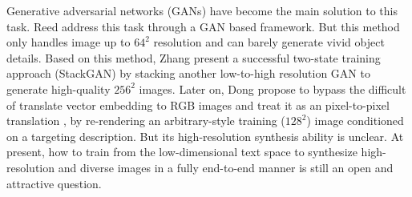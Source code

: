 \documentclass[10pt,twocolumn,letterpaper]{article}
\begin{document}
Generative adversarial networks (GANs) have become the main solution to this task. 
Reed \etal \cite{reed2016generative} address this task through a GAN based framework. But this method only handles image up to $64^2$ resolution and can barely generate vivid object details.
Based on this method, Zhang \etal \cite{han2017stackgan} present a successful two-state training approach (StackGAN) by stacking another low-to-high resolution GAN to generate high-quality $256^2$ images. Later on, Dong \etal \cite{dong2017semantic} propose to bypass the difficult of translate vector embedding to RGB images and treat it as an pixel-to-pixel translation \cite{isola2016image}, by re-rendering an arbitrary-style training ($128^2$) image conditioned on a targeting description. But its high-resolution synthesis ability is unclear. 
At present, how to train from the low-dimensional text space to synthesize high-resolution and diverse images in a fully end-to-end manner is still an open and attractive question. 
\end{document}
